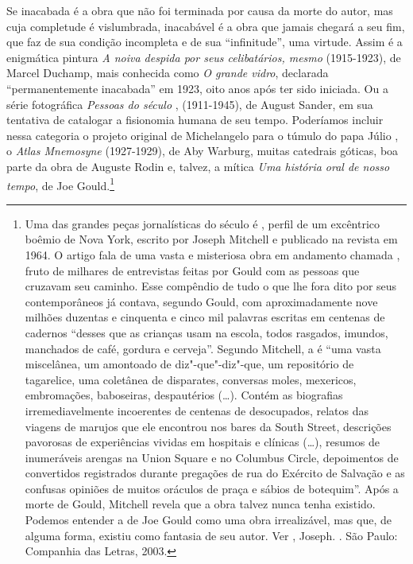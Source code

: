 Se inacabada é a obra que não foi terminada por causa da morte do autor,
mas cuja completude é vislumbrada, inacabável é a obra que jamais
chegará a seu fim, que faz de sua condição incompleta e de sua
``infinitude'', uma virtude. Assim é a enigmática pintura \emph{A noiva
despida por seus celibatários, mesmo} (1915-1923), de Marcel
Duchamp, mais conhecida como \emph{O grande vidro}, declarada
``permanentemente inacabada'' em 1923, oito anos após ter sido iniciada.
Ou a série fotográfica \emph{Pessoas do século }, (1911-1945), de
August Sander, em sua tentativa de catalogar a fisionomia humana de seu
tempo. Poderíamos incluir nessa categoria o projeto original de
Michelangelo para o túmulo do papa Júlio , o \emph{Atlas Mnemosyne}
(1927-1929), de Aby Warburg, muitas catedrais góticas, boa parte da obra
de Auguste Rodin e, talvez, a mítica \emph{Uma história oral de nosso
tempo}, de Joe Gould.\footnote{Uma das grandes peças jornalísticas do
  século  é {}, perfil de um excêntrico
  boêmio de Nova York, escrito por Joseph Mitchell e publicado na
  revista {} em 1964. O artigo fala de uma vasta e
  misteriosa obra em andamento chamada {}, fruto de milhares de entrevistas feitas por Gould com as
  pessoas que cruzavam seu caminho. Esse compêndio de tudo o que lhe
  fora dito por seus contemporâneos já contava, segundo Gould, com
  aproximadamente nove milhões duzentas e cinquenta e cinco mil palavras
  escritas em centenas de cadernos ``desses que as crianças usam na
  escola, todos rasgados, imundos, manchados de café, gordura e
  cerveja''. Segundo Mitchell, a {} é ``uma vasta
  miscelânea, um amontoado de diz"-que"-diz"-que, um repositório de
  tagarelice, uma coletânea de disparates, conversas moles, mexericos,
  embromações, baboseiras, despautérios (\ldots{}). Contém as biografias
  irremediavelmente incoerentes de centenas de desocupados, relatos das
  viagens de marujos que ele encontrou nos bares da South Street,
  descrições pavorosas de experiências vividas em hospitais e clínicas
  (\ldots{}), resumos de inumeráveis arengas na Union Square e no
  Columbus Circle, depoimentos de convertidos registrados durante
  pregações de rua do Exército de Salvação e as confusas opiniões de
  muitos oráculos de praça e sábios de botequim''. Após a morte de
  Gould, Mitchell revela que a obra talvez nunca tenha existido. Podemos
  entender a {} de Joe Gould como uma obra
  irrealizável, mas que, de alguma forma, existiu como fantasia de seu
  autor. Ver , Joseph. {}. São
  Paulo: Companhia das Letras, 2003.}


